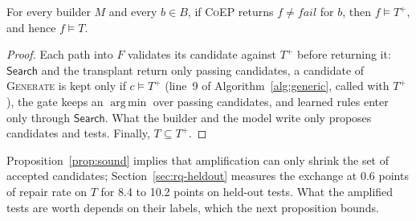 \documentclass[acmsmall,screen,review,anonymous,nonacm]{acmart}
\DeclareMathOperator*{\argmin}{arg\,min}
\newcommand{\tool}{\textsc{CoEP}\xspace}
\newcommand{\Fn}[1]{\textsc{#1}}
\newcommand{\aux}[1]{\ensuremath{\mathsf{#1}}}
\newcommand{\V}[1]{\ensuremath{\mathit{#1}}}
\begin{document}
\begin{proposition}\label{prop:sound}
For every builder $M$ and every $b \in B$, if \tool returns $f \neq \V{fail}$ for $b$, then $f \models T^{+}$, and hence $f \models T$.
\end{proposition}
\begin{proof}
Each path into $F$ validates its candidate against $T^{+}$ before returning it: \aux{Search} and the transplant return only passing candidates, a candidate of \Fn{Generate} is kept only if $c \models T^{+}$ (line~9 of Algorithm~\ref{alg:generic}, called with $T^{+}$), the gate keeps an $\argmin$ over passing candidates, and learned rules enter only through \aux{Search}. What the builder and the model write only proposes candidates and tests. Finally, $T \subseteq T^{+}$.
\end{proof}

Proposition~\ref{prop:sound} implies that amplification can only shrink the set of accepted candidates; Section~\ref{sec:rq-heldout} measures the exchange at 0.6 points of repair rate on $T$ for 8.4 to 10.2 points on held-out tests. What the amplified tests are worth depends on their labels, which the next proposition bounds.
\end{document}
